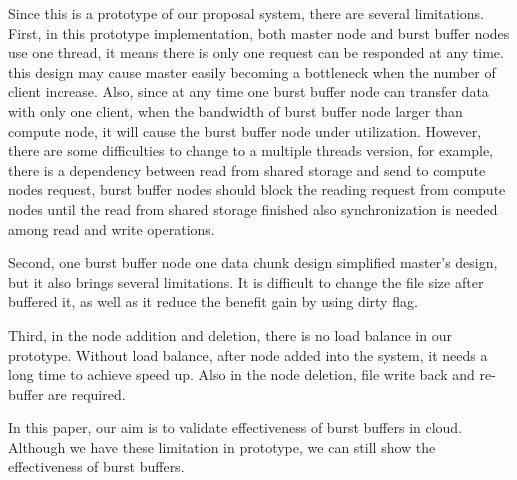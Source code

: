 Since this is a prototype of our proposal system, there are several limitations.
First, in this prototype implementation, both master node and burst buffer nodes use one thread, it means
there is only one request can be responded at any time.
this design may cause master easily becoming a bottleneck when the number of client increase.
Also, since at any time one burst buffer node can transfer data with only one client, when the bandwidth of
burst buffer node larger than compute node, it will cause the burst buffer node under utilization.
However, there are some difficulties to change to a multiple threads version, for example, there
is a dependency between read from shared storage and send to compute nodes request, burst buffer nodes should
block the reading request from compute nodes until the read from shared storage finished also
synchronization is needed among read and write operations.

Second, one burst buffer node one data chunk design simplified master's design, but it also brings several
limitations. It is difficult to change the file size after buffered it, as well as it reduce the
benefit gain by using dirty flag.

Third, in the node addition and deletion, there is no load balance in our prototype.
Without load balance, after node added into the system, it needs a long time to achieve speed up.
Also in the node deletion, file write back and re-buffer are required.

In this paper, our aim is to validate effectiveness of burst buffers in
cloud.
Although we have these limitation in prototype, we can still show the effectiveness of burst
buffers.